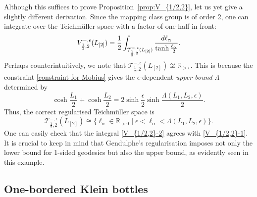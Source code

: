 \documentclass[12pt]{amsart}
\theoremstyle{plain}
\theoremstyle{definition}
\theoremstyle{remark}
\numberwithin{equation}{section}
\begin{document}
Although this suffices to prove Proposition~\ref{prop:V_{1/2,2}}, let us yet give a slightly different derivation. Since the mapping class group is of order 2, one can integrate over the Teichm\"{u}ller space with a factor of one-half in front:
\begin{align}
V^{-,\epsilon}_{\frac12,2}(L_{[2]})=\frac12\int_{\mathcal{T}_{\frac12,2}^{-,\epsilon}(L_{[2]})}\frac{d\ell_\alpha}{\tanh\frac{\ell_\alpha}{2}}.\label{V_{1/2,2}-2}
\end{align}
Perhaps counterintuitively, we note that $\mathcal{T}_{\frac12,2}^{-,\epsilon}(L_{[2]})\not\cong\mathbb{R}_{>\epsilon}$. This is because the constraint \eqref{constraint for Mobius} gives the $\epsilon$-dependent \emph{upper bound} $\Lambda$ determined by
\begin{equation}
\cosh\frac{L_1}{2}+\cosh\frac{L_2}{2}=2\sinh\frac{\epsilon}{2}\sinh\frac{\Lambda(L_1,L_2,\epsilon)}{2}.\label{Lambda}
\end{equation}
Thus, the correct regularised Teichm\"{u}ller space is 
\begin{equation}\label{Teich12-2}
\mathcal{T}_{\frac12,2}^{-,\epsilon}(L_{[2]})\cong\{\ell_\alpha\in\mathbb{R}_{>0}\mid\epsilon<\ell_\alpha<\Lambda(L_1,L_2,\epsilon)\}.
\end{equation}
One can easily check that the integral \eqref{V_{1/2,2}-2} agrees with \eqref{V_{1/2,2}-1}. It is crucial to keep in mind that Gendulphe's regularisation imposes not only the lower bound for 1-sided geodesics but also the upper bound, as evidently seen in this example.



\subsection{One-bordered Klein bottles}\label{sec:one_bordered_klein_bottles}





\end{document}
